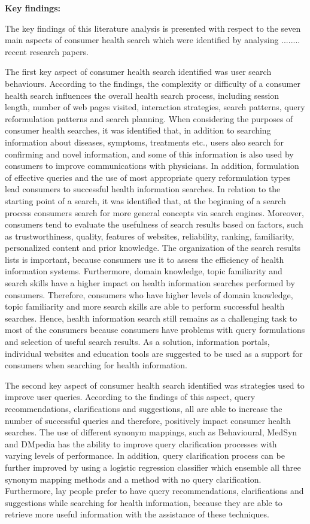 \documentclass[]{article}
\begin{document}
\textbf{Key findings:}

The key findings of this literature analysis is presented with respect to the seven main aspects of consumer health search which were identified by analysing ........ recent research papers. 

The first key aspect of consumer health search identified was user search behaviours. According to the findings, the complexity or difficulty of a consumer health search influences the overall health search process, including session length, number of web pages visited, interaction strategies, search patterns, query reformulation patterns and search planning. When considering the purposes of consumer health searches, it was identified that, in addition to searching information about diseases, symptoms, treatments etc., users also search for confirming and novel information, and some of this information is also used by consumers to improve communications with physicians. In addition, formulation of effective queries and the use of most appropriate query reformulation types lead consumers to successful health information searches. In relation to the starting point of a search, it was identified that, at the beginning of a search process consumers search for more general concepts via search engines. Moreover, consumers tend to evaluate the usefulness of search results based on factors, such as trustworthiness, quality, features of websites, reliability, ranking, familiarity, personalized content and prior knowledge. The organization of the search results lists is important, because consumers use it to assess the efficiency of health information systems. Furthermore, domain knowledge, topic familiarity and search skills have a higher impact on health information searches performed by consumers. Therefore, consumers who have higher levels of domain knowledge, topic familiarity and more search skills are able to perform successful health searches. Hence, health information search still remains as a challenging task to most of the consumers because consumers have problems with query formulations and selection of useful search results. As a solution, information portals, individual websites and education tools are suggested to be used as a support for consumers when searching for health information. 

The second key aspect of consumer health search identified was strategies used to improve user queries. According to the findings of this aspect, query recommendations, clarifications and suggestions, all are able to increase the number of successful queries and therefore, positively impact consumer health searches. The use of different synonym mappings, such as Behavioural, MedSyn and DMpedia has the ability to improve query clarification processes with varying levels of performance. In addition, query clarification process can be further improved by using a logistic regression classifier which ensemble all three synonym mapping methods and a method with no query clarification. Furthermore, lay people prefer to have query recommendations, clarifications and suggestions while searching for health information, because they are able to retrieve more useful information with the assistance of these techniques. 
\end{document}

